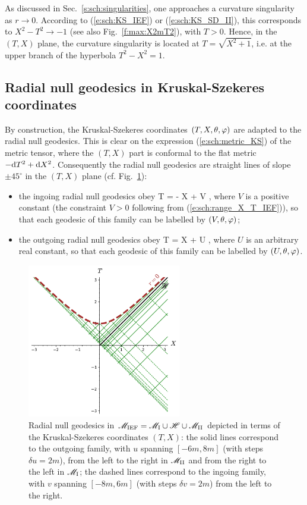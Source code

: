 As discussed in Sec.~\ref{s:sch:singularities}, one approaches a
curvature singularity as $r\rightarrow 0$. According to (\ref{e:sch:KS_IEF})
or (\ref{e:sch:KS_SD_II}),
this corresponds to $X^2-T^2 \rightarrow -1$ (see also Fig.~\ref{f:max:X2mT2}), with
$T > 0$. Hence, in the $(T,X)$ plane, the curvature singularity is located
at $T = \sqrt{X^2 + 1}$, i.e. at the upper branch of the hyperbola
$T^2 - X^2 = 1$.

\subsection{Radial null geodesics in Kruskal-Szekeres coordinates}
\label{s:sch:rad_null_geod_KS}

By construction, the Kruskal-Szekeres coordinates $(T,X,\theta,\varphi)$ are
adapted to the radial null geodesics. This is clear on the expression
(\ref{e:sch:metric_KS}) of the metric tensor, where the $(T,X)$ part is
conformal to the flat metric $- \mathrm{d} T^2 + \mathrm{d} X^2$. Consequently the radial
null geodesics are straight lines of slope $\pm 45^\circ$ in the $(T,X)$ plane
(cf. Fig.~\ref{f:sch:rad_null_geod_KS}):
\begin{itemize}
\item the ingoing radial null geodesics obey
\be \label{e:sch:ingoing_null_geod_KS}
    T = - X + V ,
\ee
where $V$ is a positive constant (the constraint $V>0$ following from (\ref{e:sch:range_X_T_IEF})), so that each geodesic of this family can be labelled
by $(V,\theta,\varphi)$;
\item the outgoing radial null geodesics obey
\be \label{e:sch:outgoing_null_geod_KS}
    T = X + U ,
\ee
where $U$ is an arbitrary real constant, so that each geodesic of this family can be labelled
by $(U,\theta,\varphi)$.
\end{itemize}
\begin{figure}
\centerline{\includegraphics[width=0.6\textwidth]{max_rad_null_geod_KS.pdf}}
\caption[]{\label{f:sch:rad_null_geod_KS} \footnotesize
Radial null geodesics in $\mathscr{M}_{\rm IEF} = \mathscr{M}_{\rm I}\cup\mathscr{H}\cup\mathscr{M}_{\rm II}$
depicted in terms of the Kruskal-Szekeres coordinates $(T,X)$: the solid
lines correspond to the outgoing family, with $u$ spanning $[-6m, 8m]$
(with steps $\delta u = 2m$), from the left to the right in $\mathscr{M}_{\rm II}$
and from the right to the left in $\mathscr{M}_{\rm I}$; the dashed lines
correspond to the ingoing family, with $v$ spanning $[-8m, 6m]$ (with steps $\delta v = 2m$)
from the left to the right.}
\end{figure}
